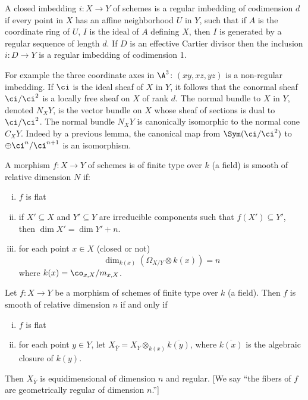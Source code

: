 \begin{dfn}
A closed imbedding $i: X \to Y$ of schemes is a regular imbedding of codimension $d$ if every point in $X$ has an affine neighborhood $U$ in $Y$, such that if $A$ is the coordinate ring of $U$, $I$ is the ideal of $A$ defining $X$, then $I$ is generated by a regular sequence of length $d$. If $D$ is an effective Cartier divisor then the inclusion $i: D \to Y$ is a regular imbedding of codimension 1. 
\end{dfn}

For example the three coordinate axes in $\A^3$: $(xy,xz,yz)$ is a non-regular imbedding. If $\ci$ is the ideal sheaf of $X$ in $Y$, it follows that the conormal sheaf $\ci/\ci^2$ is a locally free sheaf on $X$ of rank $d$. The normal bundle to $X$ in $Y$, denoted $N_XY$, is the vector bundle on $X$ whose sheaf of sections is dual to $\ci/\ci^2$. The normal bundle $N_XY$ is canonically isomorphic to the normal cone $C_XY$. Indeed by a previous lemma, the canonical map from $\Sym(\ci/\ci^2)$ to $\oplus \ci^n/\ci^{n+1}$ is an isomorphism. 


\begin{dfn}
A morphism $f: X \to Y$ of schemes is of finite type over $k$ (a field) is smooth of relative dimension $N$ if:
\begin{enumerate}[(i)]
\item $f$ is flat
\item if $X' \subseteq X$ and $Y' \subseteq Y$ are irreducible components such that $f(X') \subseteq Y'$, then $\dim X'=\dim Y'+n$.
\item for each point $x \in X$ (closed or not)
	\[
	\dim_{k(x)} \left(\Omega_{X/Y} \otimes k(x) \right)=n
	\]
where $k(x)=\co_{x,X}/m_{x,X}$.
\end{enumerate}
\end{dfn}


\begin{thmm}
Let $f: X \to Y$ be a morphism of schemes of finite type over $k$ (a field). Then $f$ is smooth of relative dimension $n$ if and only if 
\begin{enumerate}[(i)]
\item $f$ is flat
\item for each point $y \in Y$, let $X_{\overline{Y}}=X_Y \otimes_{k(x)} \overline{k(y)}$, where $\overline{k(x)}$ is the algebraic closure of $k(y)$.
\end{enumerate}
Then $X_{\overline{Y}}$ is equidimensional of dimension $n$ and regular. [We say ``the fibers of $f$ are geometrically regular of dimension $n$.'']
\end{thmm}


